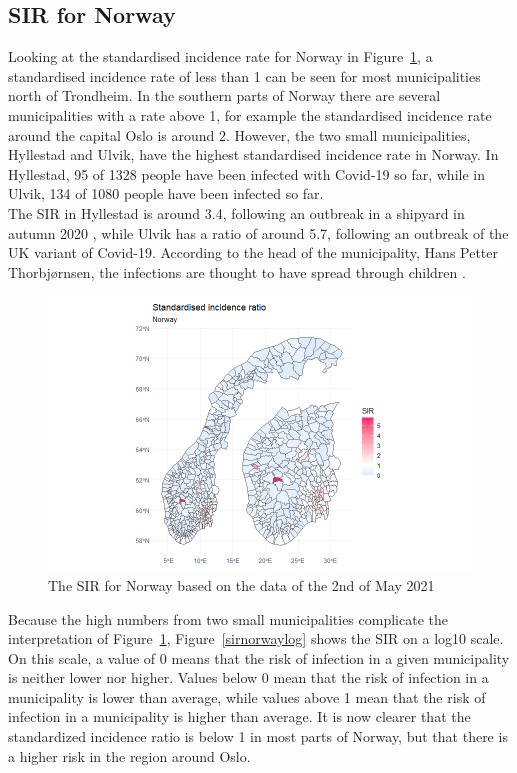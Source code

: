 \subsection{SIR for Norway}
Looking at the standardised incidence rate for Norway in Figure~\ref{sirnorway}, a standardised incidence rate of less than 1 can be seen for most municipalities north of Trondheim. In the southern parts of Norway there are several municipalities with a rate above 1, for example the standardised incidence rate around the capital Oslo is around 2. However, the two small municipalities, Hyllestad and Ulvik, have the highest standardised incidence rate in Norway. In Hyllestad, 95 of 1328 people have been infected with Covid-19 so far, while in Ulvik, 134 of 1080 people have been infected so far. \\
The SIR in Hyllestad is around 3.4, following an outbreak in a shipyard in autumn 2020 \cite{newspaper1}, while Ulvik has a ratio of around 5.7, following an outbreak of the UK variant of Covid-19. According to the head of the municipality, Hans Petter Thorbjørnsen, the infections are thought to have spread through children \cite{newspaper2}.
\begin{figure}[H]
 \centering
 \includegraphics[width = 1.2\textwidth]{sir_norway.png}
 \caption{The SIR for Norway based on the data of the 2nd of May 2021}
 \label{sirnorway}
\end{figure}
Because the high numbers from two small municipalities complicate the interpretation of Figure~\ref{sirnorway}, Figure~\ref{sirnorwaylog} shows the SIR on a log10 scale. On this scale, a value of 0 means that the risk of infection in a given municipality is neither lower nor higher. Values below 0 mean that the risk of infection in a municipality is lower than average, while values above 1 mean that the risk of infection in a municipality is higher than average. It is now clearer that the standardized incidence ratio is below 1 in most parts of Norway, but that there is a higher risk in the region around Oslo.
